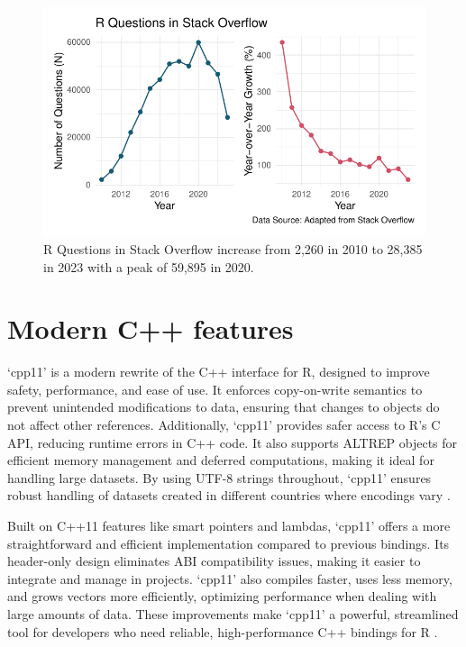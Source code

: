 \documentclass[
  10pt,
  letterpaper,
]{article}
\begin{document}
\begin{figure}[H]

{\centering \includegraphics{cpp11armadillo_files/figure-pdf/stackoverflow-1.pdf}

}

\caption{R Questions in Stack Overflow increase from 2,260 in 2010 to
28,385 in 2023 with a peak of 59,895 in 2020.}

\end{figure}%

\section{Modern C++ features}\label{modern-c-features}

`cpp11' is a modern rewrite of the C++ interface for R, designed to
improve safety, performance, and ease of use. It enforces copy-on-write
semantics to prevent unintended modifications to data, ensuring that
changes to objects do not affect other references. Additionally, `cpp11'
provides safer access to R's C API, reducing runtime errors in C++ code.
It also supports ALTREP objects for efficient memory management and
deferred computations, making it ideal for handling large datasets. By
using UTF-8 strings throughout, `cpp11' ensures robust handling of
datasets created in different countries where encodings vary
\citep{cpp11}.

Built on C++11 features like smart pointers and lambdas, `cpp11' offers
a more straightforward and efficient implementation compared to previous
bindings. Its header-only design eliminates ABI compatibility issues,
making it easier to integrate and manage in projects. `cpp11' also
compiles faster, uses less memory, and grows vectors more efficiently,
optimizing performance when dealing with large amounts of data. These
improvements make `cpp11' a powerful, streamlined tool for developers
who need reliable, high-performance C++ bindings for R \citep{cpp11}.
\end{document}
